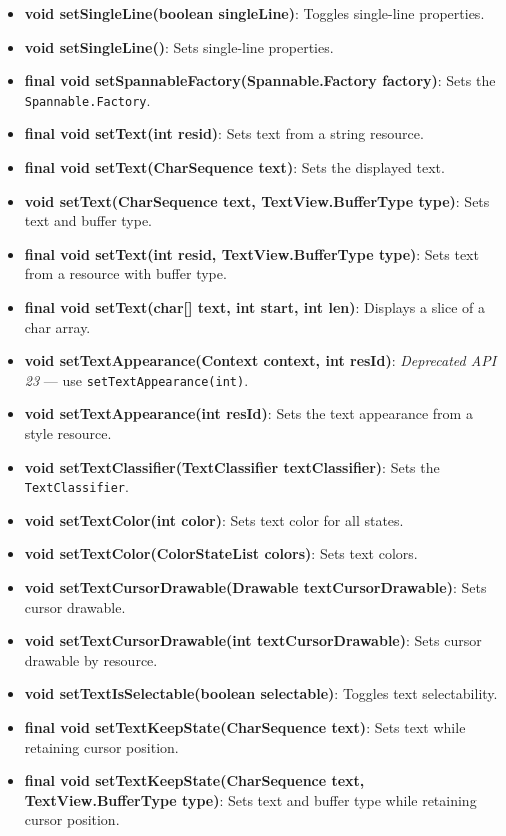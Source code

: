 \documentclass{report}
\begin{document}
\begin{itemize}
\begin{itemize}
                \item \textbf{void setSingleLine(boolean singleLine)}: Toggles single-line properties.
                \item \textbf{void setSingleLine()}: Sets single-line properties.
                \item \textbf{final void setSpannableFactory(Spannable.Factory factory)}: Sets the \texttt{Spannable.Factory}.
                \item \textbf{final void setText(int resid)}: Sets text from a string resource.
                \item \textbf{final void setText(CharSequence text)}: Sets the displayed text.
                \item \textbf{void setText(CharSequence text, TextView.BufferType type)}: Sets text and buffer type.
                \item \textbf{final void setText(int resid, TextView.BufferType type)}: Sets text from a resource with buffer type.
                \item \textbf{final void setText(char[] text, int start, int len)}: Displays a slice of a char array.
                \item \textbf{void setTextAppearance(Context context, int resId)}: \textit{Deprecated API 23} — use \texttt{setTextAppearance(int)}.
                \item \textbf{void setTextAppearance(int resId)}: Sets the text appearance from a style resource.
                \item \textbf{void setTextClassifier(TextClassifier textClassifier)}: Sets the \texttt{TextClassifier}.
                \item \textbf{void setTextColor(int color)}: Sets text color for all states.
                \item \textbf{void setTextColor(ColorStateList colors)}: Sets text colors.
                \item \textbf{void setTextCursorDrawable(Drawable textCursorDrawable)}: Sets cursor drawable.
                \item \textbf{void setTextCursorDrawable(int textCursorDrawable)}: Sets cursor drawable by resource.
                \item \textbf{void setTextIsSelectable(boolean selectable)}: Toggles text selectability.
                \item \textbf{final void setTextKeepState(CharSequence text)}: Sets text while retaining cursor position.
                \item \textbf{final void setTextKeepState(CharSequence text, TextView.BufferType type)}: Sets text and buffer type while retaining cursor position.

\end{itemize}
\end{itemize}
\end{document}
